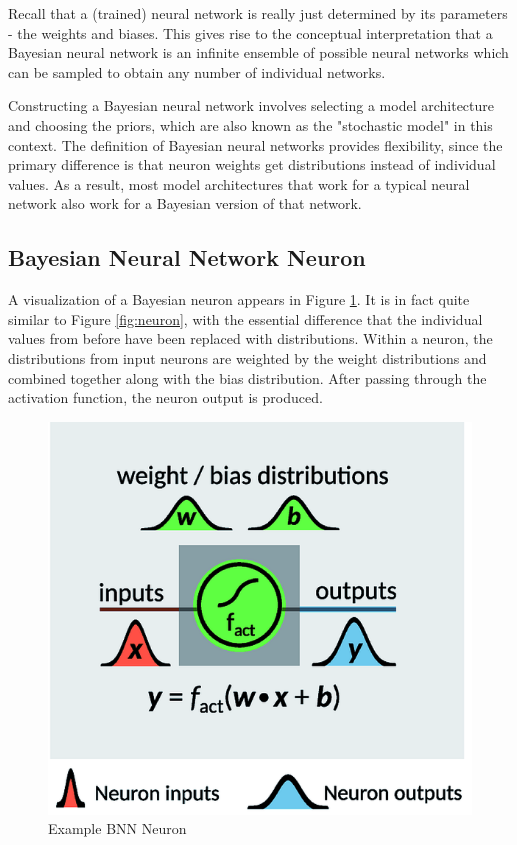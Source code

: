 \documentclass[12pt]{article}
\begin{document}
Recall that a (trained) neural network is really just determined by its parameters - the weights and biases. This gives rise to the conceptual interpretation that a Bayesian neural network is an infinite ensemble of possible neural networks which can be sampled to obtain any number of individual networks. 

Constructing a Bayesian neural network involves selecting a model architecture and choosing the priors, which are also known as the "stochastic model" in this context. The definition of Bayesian neural networks provides flexibility, since the primary difference is that neuron weights get distributions instead of individual values. As a result, most model architectures that work for a typical neural network also work for a Bayesian version of that network. %

 


\subsection{Bayesian Neural Network Neuron}

A visualization of a Bayesian neuron appears in Figure \ref{fig:bnn-neuron}. It is in fact quite similar to Figure \ref{fig:neuron}, with the essential difference that the individual values from before have been replaced with distributions. Within a neuron, the distributions from input neurons are weighted by the weight distributions and combined together along with the bias distribution. After passing through the activation function, the neuron output is produced. 

\begin{figure}[H]
	\centering
	\includegraphics[width=.55\textwidth]{../Images/BNN-neuron.png}
	\caption{Example BNN Neuron \cite{hase2019machine}}
	\label{fig:bnn-neuron}
\end{figure}
\end{document}
